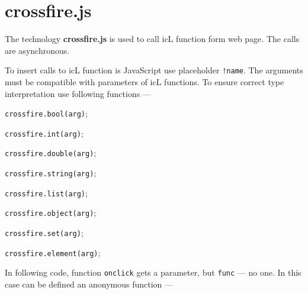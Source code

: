 \section{crossfire.js}

The technology {\bf crossfire.js} is used to call icL function form web page. The calls are asynchronous.

To insert calls to icL function is JavaScript use placeholder \texttt{!{name}}. The arguments must be compatible with parameters of icL functions. To ensure correct type interpretation use following functions —
\begin{icItems}
	\item \texttt{crossfire.bool(arg)};
	\item \texttt{crossfire.int(arg)};
	\item \texttt{crossfire.double(arg)};
	\item \texttt{crossfire.string(arg)};
	\item \texttt{crossfire.list(arg)};
	\item \texttt{crossfire.object(arg)};
	\item \texttt{crossfire.set(arg)};
	\item \texttt{crossfire.element(arg)};
\end{icItems}

In following code, function \texttt{onclick} gets a parameter, but \texttt{func} — no one. In this case can be defined an anonymous function —
\inputminted[linenos]{icl}{../sources/crossfireexample.icL}
